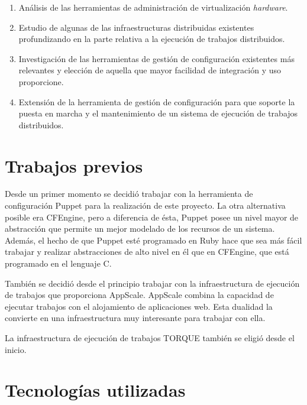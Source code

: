 \begin{enumerate}
\item Análisis de las herramientas de administración de virtualización \emph{hardware}.
\item Estudio de algunas de las infraestructuras distribuidas existentes profundizando en la parte relativa a la ejecución de trabajos distribuidos.
\item Investigación de las herramientas de gestión de configuración existentes más relevantes y elección de aquella que mayor facilidad de integración y uso proporcione.
\item Extensión de la herramienta de gestión de configuración para que soporte la puesta en marcha y el mantenimiento de un sistema de ejecución de trabajos distribuidos.
\end{enumerate}


\section{Trabajos previos}

Desde un primer momento se decidió trabajar con la herramienta de configuración Puppet para la realización de este proyecto. La otra alternativa posible era CFEngine, pero a diferencia de ésta, Puppet posee un nivel mayor de abstracción que permite un mejor modelado de los recursos de un sistema. Además, el hecho de que Puppet esté programado en Ruby hace que sea más fácil trabajar y realizar abstracciones de alto nivel en él que en CFEngine, que está programado en el lenguaje C.

También se decidió desde el principio trabajar con la infraestructura de ejecución de trabajos que proporciona AppScale. AppScale combina la capacidad de ejecutar trabajos con el alojamiento de aplicaciones web. Esta dualidad la convierte en una infraestructura muy interesante para trabajar con ella.

La infraestructura de ejecución de trabajos TORQUE también se eligió desde el inicio.


\section{Tecnologías utilizadas}

